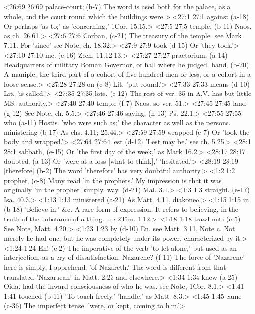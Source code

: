 <26:69 26:69  palace-court; (h-7)  The word is used both for the palace, as a whole, and the  court round which the buildings were.>
<27:1 27:1  against (a-18)  Or perhaps 'as to;' as 'concerning,' 1Cor. 15.15.>
<27:5 27:5  temple, (b-11)  Naos, as ch. 26.61.>
<27:6 27:6  Corban, (c-21)  The treasury of the temple. see Mark 7.11. For 'since' see  Note, ch. 18.32.>
<27:9 27:9  took (d-15)  Or 'they took.'>
<27:10 27:10  me. (e-16)  Zech. 11.12-13.>
<27:27 27:27  praetorium, (a-14)  Headquarters of military Roman Governor, or hall where he  judged.
  band, (b-20)  A maniple, the third part of a cohort of five hundred men or  less, or a cohort in a loose sense.>
<27:28 27:28  on (c-8)  Lit. 'put round.'>
<27:33 27:33  means (d-10)  Lit. 'is called.'>
<27:35 27:35  lots. (e-12)  The rest of ver. 35 in A.V. has but little MS. authority.>
<27:40 27:40  temple (f-7)  Naos. so ver. 51.>
<27:45 27:45  land (g-12)  See Note, ch. 5.5.>
<27:46 27:46  saying, (h-13)  Ps. 22.1.>
<27:55 27:55  who (a-11)  Hostis. 'who were such as;' the character as well as the  persons.
  ministering (b-17)  As chs. 4.11; 25.44.>
<27:59 27:59  wrapped (c-7)  Or 'took the body and wrapped.'>
<27:64 27:64  lest (d-12)  'Lest may be.' see ch. 5.25.>
<28:1 28:1  sabbath, (e-15)  Or 'the first day of the week,' as Mark 16.2.>
<28:17 28:17  doubted. (a-13)  Or 'were at a loss [what to think],' 'hesitated.'>
<28:19 28:19  [therefore] (b-2)  The word 'therefore' has very doubtful authority.>
<1:2 1:2  prophet, (c-8)  Many read 'in the prophets.' My impression is that it was  originally 'in the prophet' simply.
  way. (d-21)  Mal. 3.1.>
<1:3 1:3  straight. (e-17)  Isa. 40.3.>
<1:13 1:13  ministered (a-21)  As Matt. 4.11, diakoneo.>
<1:15 1:15  in (b-18)  'Believe in,' &c. A rare form of expression. It refers to  believing, in the truth of the substance of a thing. see 2Tim. 1.12.>
<1:18 1:18  trawl-nets (c-5)  See Note, Matt. 4.20.>
<1:23 1:23  by (d-10)  En. see Matt. 3.11, Note c. Not merely he had one, but he  was completely under its power, characterized by it.>
<1:24 1:24  Eh! (e-2)  The imperative of the verb 'to let alone,' but used as an  interjection, as a cry of dissatisfaction.
  Nazarene? (f-11)  The force of 'Nazarene' here is simply, I apprehend, 'of  Nazareth.' The word is different from that translated  'Nazaraean' in Matt. 2.23 and elsewhere.>
<1:34 1:34  knew (a-25)  Oida. had the inward consciousness of who he was. see Note,  1Cor. 8.1.>
<1:41 1:41  touched (b-11)  'To touch freely,' 'handle,' as Matt. 8.3.>
<1:45 1:45  came (c-36) The imperfect tense, 'were, or kept, coming to him.'>
